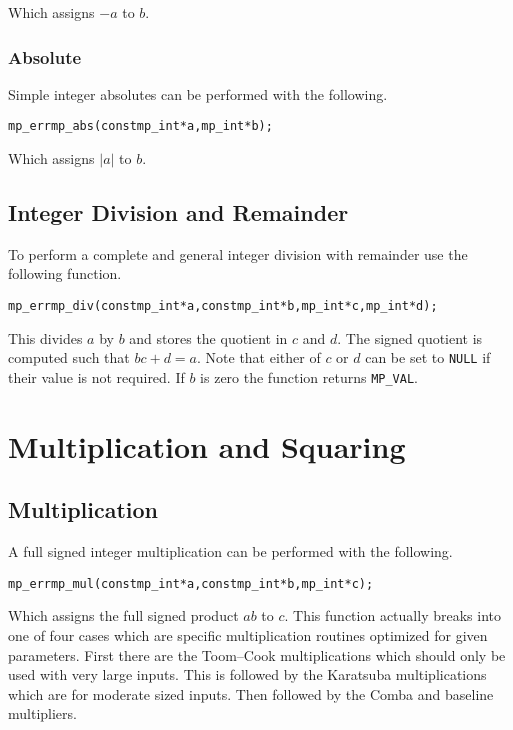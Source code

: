 \documentclass[synpaper]{book}
\begin{document}
Which assigns $-a$ to $b$.

\subsection{Absolute}
Simple integer absolutes can be performed with the following.

\begin{alltt}
mp_err mp_abs (const mp_int *a, mp_int *b);
\end{alltt}

Which assigns $\vert a \vert$ to $b$.

\section{Integer Division and Remainder}
To perform a complete and general integer division with remainder use the following function.

\begin{alltt}
mp_err mp_div (const mp_int *a, const mp_int *b, mp_int *c, mp_int *d);
\end{alltt}

This divides $a$ by $b$ and stores the quotient in $c$ and $d$.  The signed quotient is computed
such that $bc + d = a$.  Note that either of $c$ or $d$ can be set to \texttt{NULL} if their value
is not required.  If $b$ is zero the function returns \texttt{MP\_VAL}.

\chapter{Multiplication and Squaring}
\section{Multiplication}
A full signed integer multiplication can be performed with the following.

\begin{alltt}
mp_err mp_mul (const mp_int *a, const mp_int *b, mp_int *c);
\end{alltt}
Which assigns the full signed product $ab$ to $c$.  This function actually breaks into one of four
cases which are specific multiplication routines optimized for given parameters.  First there are
the Toom--Cook multiplications which should only be used with very large inputs.  This is followed
by the Karatsuba multiplications which are for moderate sized inputs.  Then followed by the Comba
and baseline multipliers.
\end{document}
